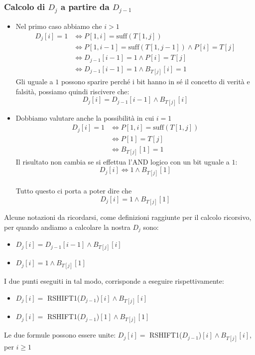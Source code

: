 \subsubsection{Calcolo di \texorpdfstring{$D_j$}{} a partire da \texorpdfstring{$D_{j-1}$}{}}
\begin{itemize}
    \item Nel primo caso abbiamo che $i>1$\\
    \begin{equation*}
        \begin{split}
            D_j[i] = 1 &\iff  P[1,i] = \mbox{suff}(T[1,j]) \\
            & \iff P[1, i-1] = \mbox{suff}(T[1, j-1]) \land  P[i] = T[j]\\
            & \iff D_{j-1}[i-1] = 1 \land P[i] = T[j]\\
            & \iff D_{j-1}[i-1] = 1 \land B_{T[j]}[i] = 1
        \end{split}
    \end{equation*}
        Gli uguale a $1$ possono sparire perché i bit hanno in sé il concetto di verità e falsità, possiamo quindi riscivere che:
        \[D_j[i] = D_{j-1}[i-1]  \land B_{T[j]}[i]\]
    \item Dobbiamo valutare anche la possibilità in cui $i=1$ \\
    \begin{equation*}
        \begin{split}
        D_j[i] = 1  & \iff P[1,i] = \mbox{suff}(T[1,j]) \\
                    & \iff P[1] = T[j] \\ 
                    & \iff B_{T[j]}[1]=1
        \end{split}
    \end{equation*}
        Il risultato non cambia se si effettua l’AND logico con un bit uguale a $1$: \[D_j[i] \iff 1 \land B_{T[j]}[1]\]\\
        Tutto questo ci porta a poter dire che \[D_j[i] = 1 \land B_{T[j]} [1] \]
\end{itemize}
Alcune notazioni da ricordarsi, come definizioni raggiunte per il calcolo ricorsivo, per quando andiamo a calcolare la nostra $D_j$ sono:
\begin{itemize}
    \item $D_j[i] = D_{j-1}[i-1] \land B_{T[j]}[i]$
    \item $D_j[i] = 1 \land B_{T[j]} [1]$ 
\end{itemize}
I due punti eseguiti in tal modo, corrisponde a eseguire rispettivamente:
\begin{itemize}
    \item $D_j[i] =$ RSHIFT1($D_{j-1}$)$[i] \land B_{T[j]}[i]$
    \item $D_j[i] =$ RSHIFT1($D_{j-1}$)$[1] \land B_{T[j]} [1]$ 
\end{itemize}
Le due formule possono essere unite: $D_j[i] =$ RSHIFT1($D_{j-1}$)$[i] \land B_{T[j]}[i]$, per $i \geq 1$

